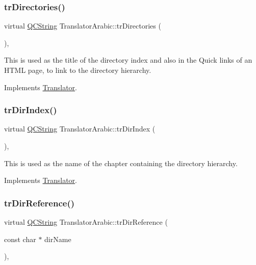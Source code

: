 \mbox{\label{class_translator_arabic_a3540585a951e0159a6a4c30266e12db2}} 
\subsubsection{\texorpdfstring{trDirectories()}{trDirectories()}}
{\footnotesize\ttfamily virtual \mbox{\hyperlink{class_q_c_string}{Q\+C\+String}} Translator\+Arabic\+::tr\+Directories (\begin{DoxyParamCaption}{ }\end{DoxyParamCaption})\hspace{0.3cm}{\ttfamily [inline]}, {\ttfamily [virtual]}}

This is used as the title of the directory index and also in the Quick links of an H\+T\+ML page, to link to the directory hierarchy. 

Implements \mbox{\hyperlink{class_translator}{Translator}}.

\mbox{\label{class_translator_arabic_a2ef6949ec9de4479e48b911a97821b94}} 
\subsubsection{\texorpdfstring{trDirIndex()}{trDirIndex()}}
{\footnotesize\ttfamily virtual \mbox{\hyperlink{class_q_c_string}{Q\+C\+String}} Translator\+Arabic\+::tr\+Dir\+Index (\begin{DoxyParamCaption}{ }\end{DoxyParamCaption})\hspace{0.3cm}{\ttfamily [inline]}, {\ttfamily [virtual]}}

This is used as the name of the chapter containing the directory hierarchy. 

Implements \mbox{\hyperlink{class_translator}{Translator}}.

\mbox{\label{class_translator_arabic_a64fb5a07d2d3d52921e3f3acdceafb4a}} 
\subsubsection{\texorpdfstring{trDirReference()}{trDirReference()}}
{\footnotesize\ttfamily virtual \mbox{\hyperlink{class_q_c_string}{Q\+C\+String}} Translator\+Arabic\+::tr\+Dir\+Reference (\begin{DoxyParamCaption}\item[{const char $\ast$}]{dir\+Name }\end{DoxyParamCaption})\hspace{0.3cm}{\ttfamily [inline]}, {\ttfamily [virtual]}}


